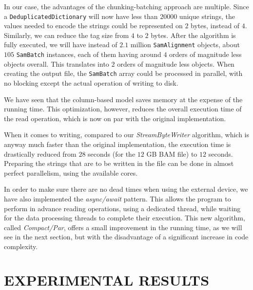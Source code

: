 \documentclass[a4paper,twoside]{article}
\begin{document}
In our case, the advantages of the chunking-batching approach are multiple.
Since a {\texttt{DeduplicatedDictionary}} will now have less than $20000$ unique strings, the values needed to encode the strings could be represented on $2$ bytes, instead of $4$.
Similarly, we can reduce the tag size from $4$ to $2$ bytes.
After the algorithm is fully executed,  we will have instead of $2.1$ million {\texttt{SamAlignment}} objects, about $105$ {\texttt{SamBatch}} instances, each of them having around $4$ orders of magnitude less objects overall.
This translates into $2$ orders of magnitude less objects.
When creating the output file, the {\texttt{SamBatch}} array could be processed in parallel, with no blocking except the actual operation of writing to disk.

We have seen that the column-based model saves memory at the expense of the running time.
This optimization, however, reduces the overall execution time of the read operation, which is now on par with the original implementation.

When it comes to writing, compared to our {\textit{StreamByteWriter} } algorithm, which is anyway much faster than the original implementation, the execution time is drastically reduced from $28$ seconds (for the $12$ GB BAM file) to $12$ seconds.
Preparing the strings that are to be written in the file can be done in almost perfect parallelism, using the available cores.

In order to make sure there are no dead times when using the external device, 
we have also implemented the {\textit{async/await}} pattern.
This allows the program to perform in advance reading operations, using a dedicated thread, while waiting for the data processing threads to complete their execution.
This new algorithm, called {\textit{Compact/Par}}, offers a small improvement in the running time, as we will see in the next section, but with the disadvantage of a significant increase in code complexity.




\section{\uppercase{Experimental Results}}
\label{sec:results}
\end{document}
